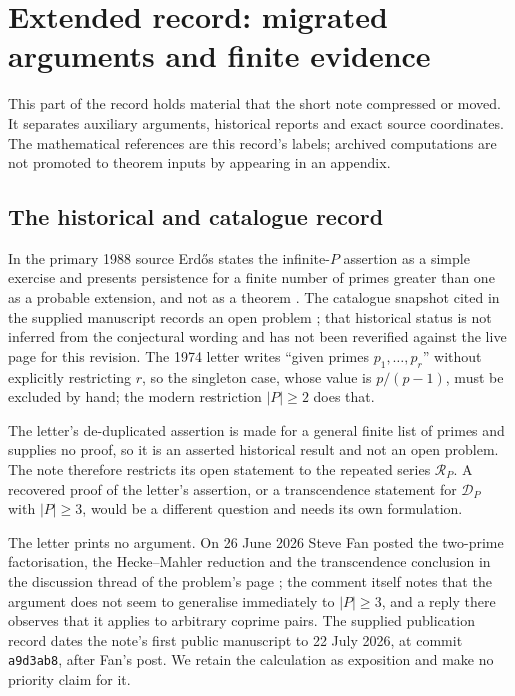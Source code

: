 \section{Extended record: migrated arguments and finite evidence}
\label{long269:long:extended}

This part of the record holds material that the short note compressed or moved.
It separates auxiliary arguments, historical reports and exact source
coordinates.  The mathematical references are this record's labels;
archived computations are not promoted to theorem inputs by appearing in
an appendix.

\subsection{The historical and catalogue record}\label{long269:long:history}

In the primary 1988 source Erd\H{o}s states the infinite-$P$ assertion as a
simple exercise and presents persistence for a finite number of primes greater
than one as a probable extension, and not as a theorem
\cite[p.~106]{erdos1988}.  The catalogue snapshot cited in the supplied
manuscript records an open problem \cite{erdosproblems}; that historical
status is not inferred from the conjectural wording and has not been
reverified against the live page for this revision.  The 1974 letter writes ``given primes $p_1,\ldots,p_r$'' without
explicitly restricting $r$, so the singleton case, whose value is $p/(p-1)$,
must be excluded by hand; the modern restriction $|P|\ge2$ does that.

The letter's de-duplicated assertion is made for a general finite list of
primes and supplies no proof, so it is an asserted historical result and not an
open problem.  The note therefore restricts its open statement to the repeated
series $\mathcal R_P$.  A recovered proof of the letter's assertion, or a
transcendence statement for $\mathcal D_P$ with $|P|\ge3$, would be a different
question and needs its own formulation.

The letter prints no argument.  On 26 June 2026 Steve Fan posted the
two-prime factorisation, the Hecke--Mahler reduction and the transcendence
conclusion in the discussion thread of the problem's page
\cite{fan2026comment}; the comment itself notes that the argument does not seem
to generalise immediately to $|P|\ge3$, and a reply there observes that it
applies to arbitrary coprime pairs.  The supplied publication record dates the note's first public manuscript
to 22 July 2026, at commit \texttt{a9d3ab8}, after Fan's post.  We retain
the calculation as exposition and make no priority claim for it.

